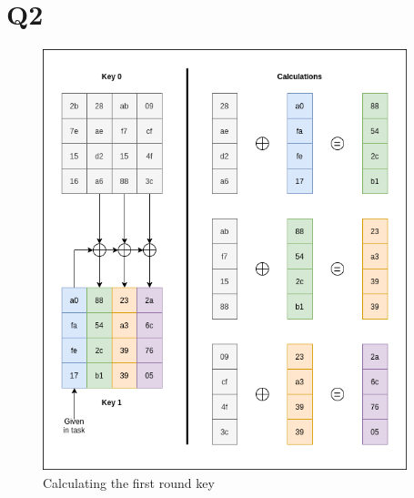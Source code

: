 \documentclass{article}
\begin{document}
\newpage
\section{Q2}


\begin{figure}[H]
 \centering
  \includegraphics[width=300pt]{img/AESKey1.png}
 \caption{Calculating the first round key}
 \end{figure}
\end{document}

